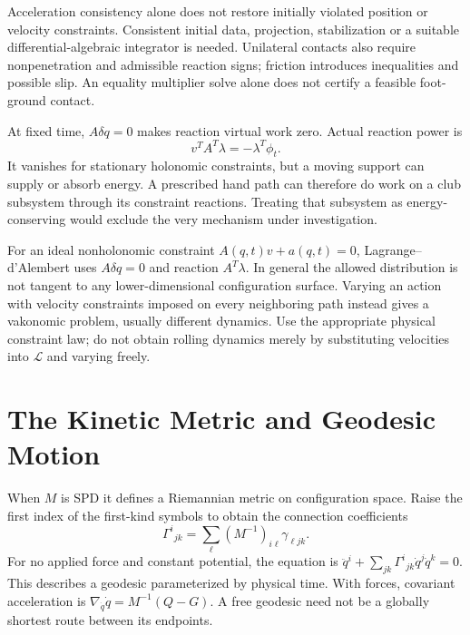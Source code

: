 Acceleration consistency alone does not restore initially violated position or velocity constraints. Consistent initial data, projection, stabilization or a suitable differential-algebraic integrator is needed. Unilateral contacts also require nonpenetration and admissible reaction signs; friction introduces inequalities and possible slip. An equality multiplier solve alone does not certify a feasible foot-ground contact.

At fixed time, $A\delta q=0$ makes reaction virtual work zero. Actual reaction power is
\begin{equation}
v^TA^T\lambda=-\lambda^T\phi_t.
\label{eq:lagrangian_constraint_power}
\end{equation}
It vanishes for stationary holonomic constraints, but a moving support can supply or absorb energy. A prescribed hand path can therefore do work on a club subsystem through its constraint reactions. Treating that subsystem as energy-conserving would exclude the very mechanism under investigation.

For an ideal nonholonomic constraint $A(q,t)v+a(q,t)=0$, Lagrange--d'Alembert uses $A\delta q=0$ and reaction $A^T\lambda$. In general the allowed distribution is not tangent to any lower-dimensional configuration surface. Varying an action with velocity constraints imposed on every neighboring path instead gives a vakonomic problem, usually different dynamics. Use the appropriate physical constraint law; do not obtain rolling dynamics merely by substituting velocities into $\mathcal L$ and varying freely.

\section{The Kinetic Metric and Geodesic Motion}
\label{sec:christoffel}

When $M$ is SPD it defines a Riemannian metric on configuration space. Raise the first index of the first-kind symbols to obtain the connection coefficients
\begin{equation}
\Gamma^i{}_{jk}=\sum_\ell(M^{-1})_{i\ell}\gamma_{\ell jk}.
\label{eq:lagrangian_christoffel_second}
\end{equation}
For no applied force and constant potential, the equation is $\ddot q^i+\sum_{jk}\Gamma^i{}_{jk}\dot q^j\dot q^k=0$. This describes a geodesic parameterized by physical time. With forces, covariant acceleration is $\nabla_{\dot q}\dot q=M^{-1}(Q-G)$. A free geodesic need not be a globally shortest route between its endpoints.

